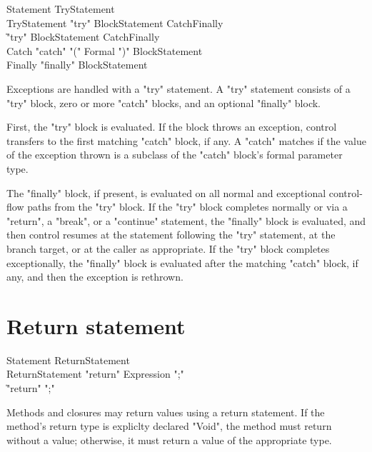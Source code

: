 \begin{grammar}
Statement \: TryStatement \\
TryStatement \: \xcd"try" BlockStatement Catch\plus Finally\opt \\
             \| \xcd"try" BlockStatement Catch\star Finally \\
Catch \: \xcd"catch" \xcd"(" Formal \xcd")" BlockStatement \\
Finally \: \xcd"finally" BlockStatement \\
\end{grammar}

Exceptions are handled with a \xcd"try" statement.
A \xcd"try" statement consists of a \xcd"try" block, zero or more
\xcd"catch" blocks, and an optional \xcd"finally" block.

First, the \xcd"try" block is evaluated.  If the block throws an
exception, control transfers to the first matching \xcd"catch"
block, if any.  A \xcd"catch" matches if the value of the
exception thrown is a subclass of the \xcd"catch" block's formal
parameter type.

The \xcd"finally" block, if present, is evaluated on all normal
and exceptional control-flow paths from the \xcd"try" block.
If the \xcd"try" block completes normally
or via a \xcd"return", a \xcd"break", or a
\xcd"continue" statement, 
the \xcd"finally"
block is evaluated, and then control resumes at
the statement following the \xcd"try" statement, at the branch target, or at
the caller as appropriate.
If the \xcd"try" block completes
exceptionally, the \xcd"finally" block is evaluated after the
matching \xcd"catch" block, if any, and then the
exception is rethrown.

\section{Return statement}
\label{ReturnStatement}
\begin{grammar}
Statement \: ReturnStatement \\
ReturnStatement \: \xcd"return" Expression \xcd";" \\
             \| \xcd"return" \xcd";" \\
\end{grammar}

Methods and closures may return values using a return statement.
If the method's return type is expliclty declared \xcd"Void",
the method must return without a value; otherwise, it must return
a value of the appropriate type.
